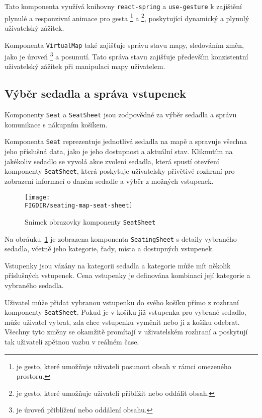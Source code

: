 Tato komponenta využívá knihovny \texttt{react-spring} a \texttt{use-gesture} k zajištění plynulé a responzivní animace pro gesta \footnote{ je gesto, které umožňuje uživateli posunout obsah v rámci omezeného prostoru.} a \footnote{ je gesto, které umožňuje uživateli přiblížit nebo oddálit obsah.
}, poskytující dynamický a plynulý uživatelský zážitek.

Komponenta \texttt{VirtualMap} také zajišťuje správu stavu mapy, sledováním změn, jako je úroveň \footnote{ je úroveň přiblížení nebo oddálení obsahu.} a posunutí.
Tato správa stavu zajišťuje především konzistentní uživatelský zážitek při manipulaci mapy uživatelem.

\subsection{Výběr sedadla a správa vstupenek}
\label{subsec:implementace-seating-seat}
Komponenty \texttt{Seat} a \texttt{SeatSheet} jsou zodpovědné za výběr sedadla a správu komunikace s nákupním košíkem.

Komponenta \texttt{Seat} reprezentuje jednotlivá sedadla na mapě a spravuje všechna jeho příslušná data, jako je jeho dostupnost a aktuální stav.
Kliknutím na jakékoliv sedadlo se vyvolá akce zvolení sedadla, která spustí otevření komponenty \texttt{SeatSheet}, která poskytuje uživatelsky přívětivé rozhraní pro zobrazení informací o daném sedadle a výběr z možných vstupenek.

\begin{figure}[h]
	\centering
	\texttt{[image: \\FIGDIR/seating-map-seat-sheet]}
	\caption{Snímek obrazovky komponenty \texttt{SeatSheet}}
	\label{fig:seating-map-seats-sheet}
\end{figure}

Na obráuku~\ref{fig:seating-map-seats-sheet} je zobrazena komponenta \texttt{SeatingSheet} s detaily vybraného sedadla, včetně jeho kategorie, řady, místa a dostupných vstupenek.

Vstupenky jsou vázány na kategorii sedadla a kategorie může mít několik příslušných vstupenek.
Cena vstupenky je definována kombinací její kategorie a vybraného sedadla.

Uživatel může přidat vybranou vstupenku do svého košíku přímo z rozhraní komponenty \texttt{SeatSheet}.
Pokud je v košíku již vstupenka pro vybrané sedadlo, může uživatel vybrat, zda chce vstupenku vyměnit nebo ji z košíku odebrat.
Všechny tyto změny se okamžitě promítají v uživatelském rozhraní a poskytují tak uživateli zpětnou vazbu v reálném čase.

